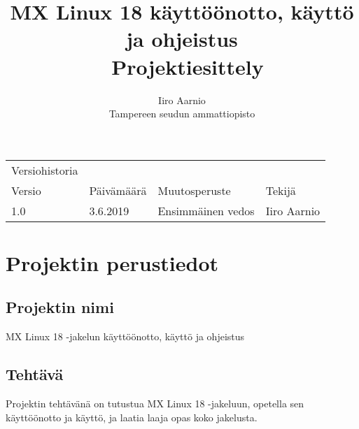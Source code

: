 \documentclass[a4paper, 12pt, finnish]{article}
\begin{document}
\title{MX Linux 18 käyttöönotto, käyttö ja ohjeistus \\ \large Projektiesittely}
\author{Iiro Aarnio\\ Tampereen seudun ammattiopisto}
\maketitle
\thispagestyle{empty}
\newpage
\thispagestyle{empty}
\newpage
\begin{table}[htpb]
\begin{tabular}{llll}
Versiohistoria &            &                         &             \\
\rowcolor[HTML]{FFCCC9}
Versio         & Päivämäärä & Muutosperuste           & Tekijä      \\
1.0              & 3.6.2019   & Ensimmäinen vedos       & Iiro Aarnio \\
\end{tabular}
\end{table}

\newpage
\thispagestyle{empty}
\tableofcontents
\newpage
\section{Projektin perustiedot}

\subsection{Projektin nimi}

MX Linux 18 -jakelun käyttöönotto, käyttö ja ohjeistus

\subsection{Tehtävä}
Projektin tehtävänä on tutustua MX Linux 18 -jakeluun, opetella sen käyttöönotto ja käyttö, ja laatia laaja opas koko jakelusta.
\end{document}
